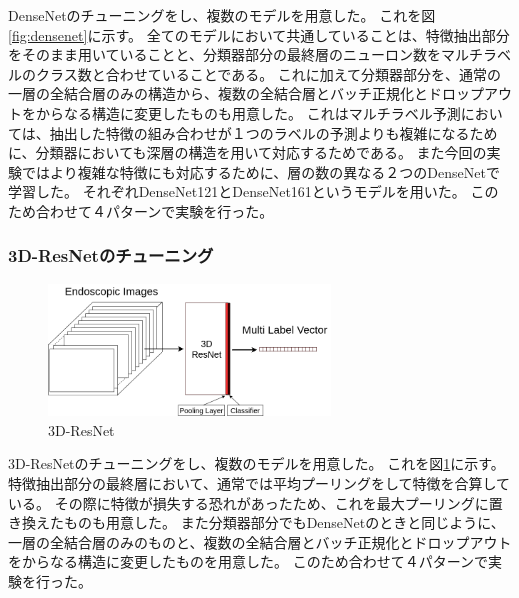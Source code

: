 DenseNetのチューニングをし、複数のモデルを用意した。
これを図\ref{fig:densenet}に示す。
全てのモデルにおいて共通していることは、特徴抽出部分をそのまま用いていることと、分類器部分の最終層のニューロン数をマルチラベルのクラス数と合わせていることである。
これに加えて分類器部分を、通常の一層の全結合層のみの構造から、複数の全結合層とバッチ正規化とドロップアウトをからなる構造に変更したものも用意した。
これはマルチラベル予測においては、抽出した特徴の組み合わせが１つのラベルの予測よりも複雑になるために、分類器においても深層の構造を用いて対応するためである。
また今回の実験ではより複雑な特徴にも対応するために、層の数の異なる２つのDenseNetで学習した。
それぞれDenseNet121\cite{DenseNet}とDenseNet161\cite{DenseNet}というモデルを用いた。
このため合わせて４パターンで実験を行った。
\subsubsection{3D-ResNetのチューニング}

\begin{figure}[tb]
    \begin{center}
        \includegraphics[width=75mm]{./fig/ieice3.png}
        \caption{3D-ResNet}
        \label{fig:3d_resnet}
    \end{center}
\end{figure}

3D-ResNetのチューニングをし、複数のモデルを用意した。
これを図\ref{fig:3d_resnet}に示す。
特徴抽出部分の最終層において、通常では平均プーリングをして特徴を合算している。
その際に特徴が損失する恐れがあったため、これを最大プーリングに置き換えたものも用意した。
また分類器部分でもDenseNetのときと同じように、一層の全結合層のみのものと、複数の全結合層とバッチ正規化とドロップアウトをからなる構造に変更したものを用意した。
このため合わせて４パターンで実験を行った。
